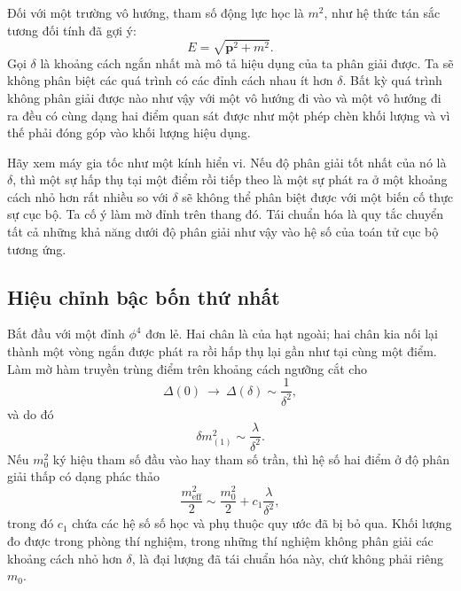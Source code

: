 Đối với một trường vô hướng, tham số động lực học là \(m^2\), như hệ thức tán sắc tương đối tính đã gợi ý:
\begin{equation}
E=\sqrt{\mathbf p^2+m^2}.
\end{equation}
Gọi \(\delta\) là khoảng cách ngắn nhất mà mô tả hiệu dụng của ta phân giải được. Ta sẽ không phân biệt các quá trình có các đỉnh cách nhau ít hơn \(\delta\). Bất kỳ quá trình không phân giải được nào như vậy với một vô hướng đi vào và một vô hướng đi ra đều có cùng dạng hai điểm quan sát được như một phép chèn khối lượng và vì thế phải đóng góp vào khối lượng hiệu dụng.

Hãy xem máy gia tốc như một kính hiển vi. Nếu độ phân giải tốt nhất của nó là \(\delta\), thì một sự hấp thụ tại một điểm rồi tiếp theo là một sự phát ra ở một khoảng cách nhỏ hơn rất nhiều so với \(\delta\) sẽ không thể phân biệt được với một biến cố thực sự cục bộ. Ta cố ý làm mờ đỉnh trên thang đó. Tái chuẩn hóa là quy tắc chuyển tất cả những khả năng dưới độ phân giải như vậy vào hệ số của toán tử cục bộ tương ứng.

\subsection{Hiệu chỉnh bậc bốn thứ nhất}

Bắt đầu với một đỉnh \(\phi^4\) đơn lẻ. Hai chân là của hạt ngoài; hai chân kia nối lại thành một vòng ngắn được phát ra rồi hấp thụ lại gần như tại cùng một điểm. Làm mờ hàm truyền trùng điểm trên khoảng cách ngưỡng cắt cho
\begin{equation}
\Delta(0)\ \longrightarrow\ \Delta(\delta)\sim\frac{1}{\delta^2},
\end{equation}
và do đó
\begin{equation}
\delta m^2_{(1)}\sim\frac{\lambda}{\delta^2}.
\label{eq:one-loop-scalar-mass}
\end{equation}
Nếu \(m_0^2\) ký hiệu tham số đầu vào hay tham số trần, thì hệ số hai điểm ở độ phân giải thấp có dạng phác thảo
\begin{equation}
\frac{m_{\mathrm{eff}}^2}{2}
\sim
\frac{m_0^2}{2}
+c_1\frac{\lambda}{\delta^2},
\label{eq:first-renormalized-mass}
\end{equation}
trong đó \(c_1\) chứa các hệ số số học và phụ thuộc quy ước đã bị bỏ qua. Khối lượng đo được trong phòng thí nghiệm, trong những thí nghiệm không phân giải các khoảng cách nhỏ hơn \(\delta\), là đại lượng đã tái chuẩn hóa này, chứ không phải riêng \(m_0\).

